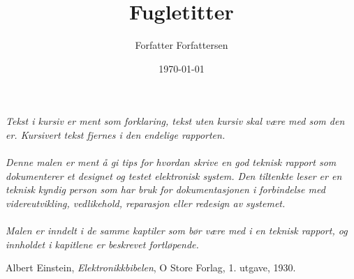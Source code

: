 \documentclass[11pt,norsk]{elsys-teknisk}
\title{Fugletitter}
\author{Forfatter Forfattersen}
\date{\today}
\begin{document}
\maketitle

\toc

\textit{Tekst i kursiv er ment som forklaring, tekst uten kursiv skal være med som den er. Kursivert tekst fjernes i den endelige rapporten.\\
\\
Denne malen er ment å gi tips for hvordan skrive en god teknisk rapport som dokumenterer et designet og testet elektronisk system. Den tiltenkte leser er en teknisk kyndig person som har bruk for dokumentasjonen i forbindelse med videreutvikling, vedlikehold, reparasjon eller redesign av systemet.\\
\\
Malen er inndelt i de samme kaptiler som bør være med i en teknisk rapport, og innholdet i kapitlene er beskrevet fortløpende.
}














{}
\begin{thebibliography}{99}

  Albert Einstein,
  \emph{Elektronikkbibelen},
  O Store Forlag,
  1. utgave,
  1930.

\end{thebibliography}


\appendix

\end{document}
